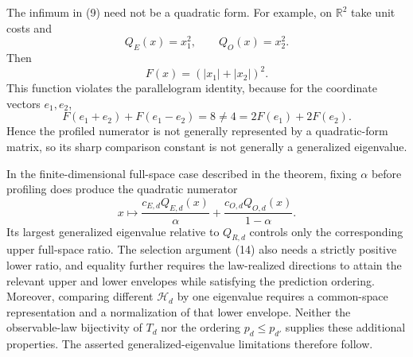 The infimum in (9) need not be a quadratic form.  For example, on \(\mathbb R^2\) take unit costs and
\[
 Q_E(x)=x_1^2,
 \qquad Q_O(x)=x_2^2.
\]
Then
\[
 F(x)=(|x_1|+|x_2|)^2.
\]
This function violates the parallelogram identity, because for the coordinate vectors \(e_1,e_2\),
\[
 F(e_1+e_2)+F(e_1-e_2)=8
 \ne 4=2F(e_1)+2F(e_2).                                    \tag{16}
\]
Hence the profiled numerator is not generally represented by a quadratic-form matrix, so its sharp comparison constant is not generally a generalized eigenvalue.

In the finite-dimensional full-space case described in the theorem, fixing \(\alpha\) before profiling does produce the quadratic numerator
\[
 x\longmapsto
 \frac{c_{E,d}Q_{E,d}(x)}{\alpha}
 +\frac{c_{O,d}Q_{O,d}(x)}{1-\alpha}.
\]
Its largest generalized eigenvalue relative to \(Q_{R,d}\) controls only the corresponding upper full-space ratio.  The selection argument (14) also needs a strictly positive lower ratio, and equality further requires the law-realized directions to attain the relevant upper and lower envelopes while satisfying the prediction ordering.  Moreover, comparing different \(\mathcal H_d\) by one eigenvalue requires a common-space representation and a normalization of that lower envelope.  Neither the observable-law bijectivity of \(T_d\) nor the ordering \(p_d\le p_{d'}\) supplies these additional properties.  The asserted generalized-eigenvalue limitations therefore follow.